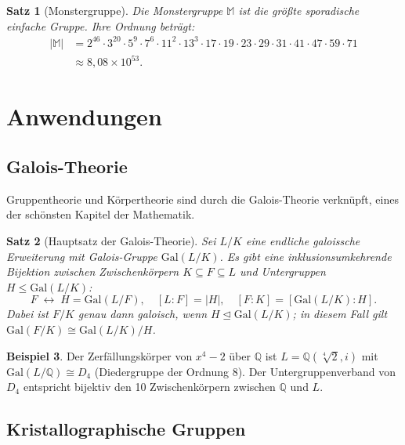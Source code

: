 \documentclass[12pt,a4paper]{amsart}
\newtheorem{theorem}{Satz}[section]
\theoremstyle{definition}
\newtheorem{example}[theorem]{Beispiel}
\begin{document}
\begin{theorem}[Monstergruppe]
Die \emph{Monstergruppe} $\mathbb{M}$ ist die größte sporadische einfache Gruppe.
Ihre Ordnung beträgt:
\begin{align*}
  |\mathbb{M}| &= 2^{46} \cdot 3^{20} \cdot 5^9 \cdot 7^6 \cdot 11^2 \cdot 13^3
                  \cdot 17 \cdot 19 \cdot 23 \cdot 29 \cdot 31 \cdot 41 \cdot 47
                  \cdot 59 \cdot 71\\
               &\approx 8{,}08 \times 10^{53}.
\end{align*}
\end{theorem}

\section{Anwendungen}
\label{sec:anwendungen}

\subsection{Galois-Theorie}

Gruppentheorie und Körpertheorie sind durch die Galois-Theorie verknüpft, eines der
schönsten Kapitel der Mathematik.

\begin{theorem}[Hauptsatz der Galois-Theorie]
\label{thm:galois_hauptsatz}
Sei $L/K$ eine endliche galoissche Erweiterung mit Galois-Gruppe $\mathrm{Gal}(L/K)$.
Es gibt eine inklusionsumkehrende Bijektion zwischen Zwischenkörpern
$K \subseteq F \subseteq L$ und Untergruppen $H \leq \mathrm{Gal}(L/K)$:
\[
  F \;\longleftrightarrow\; H = \mathrm{Gal}(L/F), \quad
  [L : F] = |H|, \quad [F : K] = [\mathrm{Gal}(L/K) : H].
\]
Dabei ist $F/K$ genau dann galoisch, wenn $H \trianglelefteq \mathrm{Gal}(L/K)$;
in diesem Fall gilt $\mathrm{Gal}(F/K) \cong \mathrm{Gal}(L/K)/H$.
\end{theorem}

\begin{example}
Der Zerfällungskörper von $x^4 - 2$ über $\mathbb{Q}$ ist $L = \mathbb{Q}(\sqrt[4]{2},i)$
mit $\mathrm{Gal}(L/\mathbb{Q}) \cong D_4$ (Diedergruppe der Ordnung 8). Der
Untergruppenverband von $D_4$ entspricht bijektiv den 10 Zwischenkörpern zwischen
$\mathbb{Q}$ und $L$.
\end{example}

\subsection{Kristallographische Gruppen}
\end{document}
